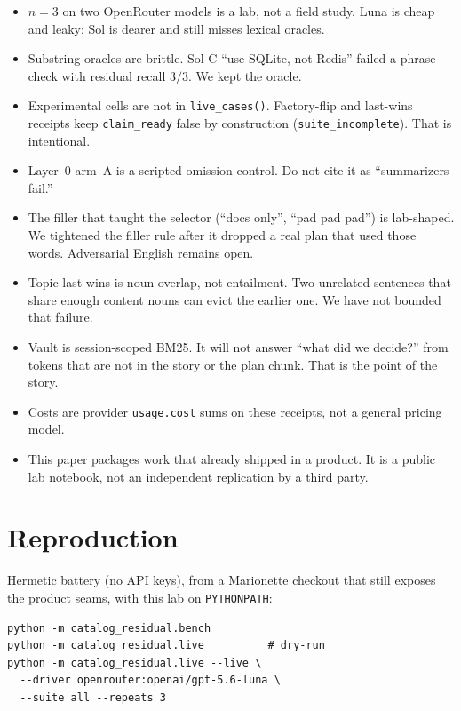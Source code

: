 \documentclass[11pt]{article}
\newcommand{\arm}[1]{\textsf{#1}}
\begin{document}
\begin{itemize}[leftmargin=1.2em,itemsep=0.35em]
\item $n{=}3$ on two OpenRouter models is a lab, not a field study.
  Luna is cheap and leaky; Sol is dearer and still misses lexical
  oracles.
\item Substring oracles are brittle. Sol \arm{C} ``use SQLite, not
  Redis'' failed a phrase check with residual recall $3/3$. We kept
  the oracle.
\item Experimental cells are not in \texttt{live\_cases()}.
  Factory-flip and last-wins receipts keep
  \texttt{claim\_ready} false by construction
  (\texttt{suite\_incomplete}). That is intentional.
\item Layer~0 arm~\arm{A} is a scripted omission control. Do not cite
  it as ``summarizers fail.''
\item The filler that taught the selector (``docs only'',
  ``pad pad pad'') is lab-shaped. We tightened the filler rule after
  it dropped a real plan that used those words. Adversarial English
  remains open.
\item Topic last-wins is noun overlap, not entailment. Two unrelated
  sentences that share enough content nouns can evict the earlier
  one. We have not bounded that failure.
\item Vault is session-scoped BM25. It will not answer
  ``what did we decide?'' from tokens that are not in the story or
  the plan chunk. That is the point of the story.
\item Costs are provider \texttt{usage.cost} sums on these receipts,
  not a general pricing model.
\item This paper packages work that already shipped in a product. It
  is a public lab notebook, not an independent replication by a third
  party.
\end{itemize}

\section{Reproduction}
\label{sec:repro}

Hermetic battery (no API keys), from a Marionette checkout that still
exposes the product seams, with this lab on \texttt{PYTHONPATH}:

\begin{verbatim}
python -m catalog_residual.bench
python -m catalog_residual.live          # dry-run
python -m catalog_residual.live --live \
  --driver openrouter:openai/gpt-5.6-luna \
  --suite all --repeats 3
\end{verbatim}
\end{document}
